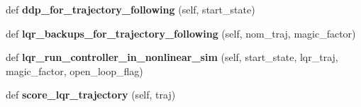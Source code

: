 \begin{DoxyCompactItemize}
def {\bfseries ddp\+\_\+for\+\_\+trajectory\+\_\+following} (self, start\+\_\+state)
\item 
\hypertarget{classaml__lfd_1_1ilqr_1_1ilqr__traj__follow_1_1_d_d_p___traj_follow_class_a652d64a61fa17a71b6167fc305f5a9bf}{}\label{classaml__lfd_1_1ilqr_1_1ilqr__traj__follow_1_1_d_d_p___traj_follow_class_a652d64a61fa17a71b6167fc305f5a9bf} 
def {\bfseries lqr\+\_\+backups\+\_\+for\+\_\+trajectory\+\_\+following} (self, nom\+\_\+traj, magic\+\_\+factor)
\item 
\hypertarget{classaml__lfd_1_1ilqr_1_1ilqr__traj__follow_1_1_d_d_p___traj_follow_class_a35305ca05d7d3f8754ffbb6ab96c3f16}{}\label{classaml__lfd_1_1ilqr_1_1ilqr__traj__follow_1_1_d_d_p___traj_follow_class_a35305ca05d7d3f8754ffbb6ab96c3f16} 
def {\bfseries lqr\+\_\+run\+\_\+controller\+\_\+in\+\_\+nonlinear\+\_\+sim} (self, start\+\_\+state, lqr\+\_\+traj, magic\+\_\+factor, open\+\_\+loop\+\_\+flag)
\item 
\hypertarget{classaml__lfd_1_1ilqr_1_1ilqr__traj__follow_1_1_d_d_p___traj_follow_class_a2ce0f16508e6137bfabb910c449245fa}{}\label{classaml__lfd_1_1ilqr_1_1ilqr__traj__follow_1_1_d_d_p___traj_follow_class_a2ce0f16508e6137bfabb910c449245fa} 
def {\bfseries score\+\_\+lqr\+\_\+trajectory} (self, traj)
\end{DoxyCompactItemize}
